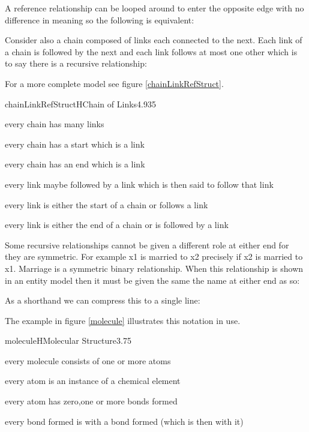 
\noindent A reference relationship can be looped around to enter the opposite edge with no difference in meaning so the following is equivalent:


\noindent Consider also a chain composed of links each connected to the next.
Each link of a chain is followed by the next and each link follows at most one other which is to say there is a recursive relationship: 


\noindent For a more complete model see figure \ref{chainLinkRefStruct}.


\begin{erbulletedDimFig}{chainLinkRefStruct}{H}{Chain of Links}{4.93}{5}
\item every chain has many links
\item every chain has a start which is a link
\item every chain has an end which is a link
\item every link maybe followed by a link which is then said to follow that link
\item every link is either the start of a chain or follows a link
\item every link is either the end of a chain or is followed by a link
\end{erbulletedDimFig}

\noindent Some recursive relationships cannot be given a different role at either end for they are symmetric. For example x1 is married to x2 precisely if x2 is married to x1. Marriage is a symmetric binary relationship. When this relationship is shown in an entity model then it must be given the same the name at either end as so:


\noindent As a shorthand we can compress this to a single line:


\noindent The example in figure \ref{molecule} illustrates this notation in use.

\begin{erbulletedDimFig}{molecule}{H}{Molecular Structure}{3.7}{5}
\item every molecule  consists of one or more atoms
\item every atom is an instance of a chemical element
\item every atom has zero,one or more bonds formed
\item every bond formed is with a bond formed (which is then with it)
\end{erbulletedDimFig}


